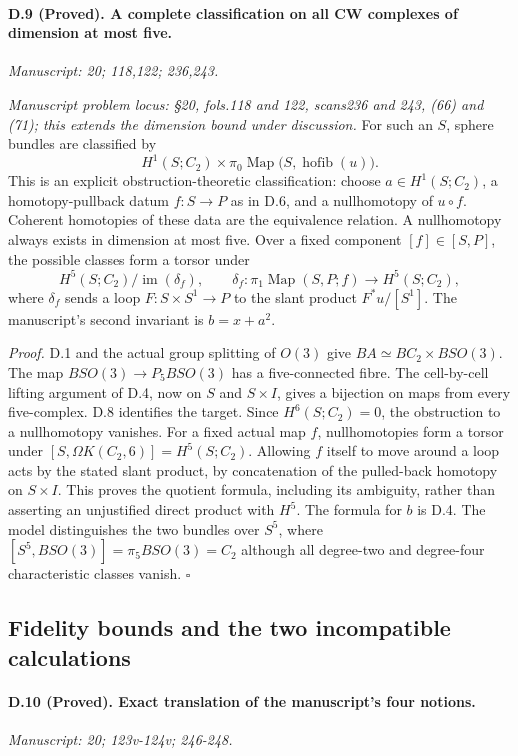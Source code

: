 \paragraph{D.9 (Proved). A complete classification on all CW complexes of dimension at most five.}
\textit{Manuscript: 20; 118,122; 236,243.}

\emph{Manuscript problem locus: \S20, fols.118 and 122, scans236 and 243, (66) and (71); this extends the dimension bound under discussion.}
For such an $S$, sphere bundles are classified by
\[
H^1(S;C_2)\times
\pi_0\operatorname{Map}\bigl(S,\operatorname{hofib}(u)\bigr).
\]
This is an explicit obstruction-theoretic classification: choose $a\in H^1(S;C_2)$, a homotopy-pullback datum $f:S\to P$ as in D.6, and a nullhomotopy of $u\circ f$. Coherent homotopies of these data are the equivalence relation. A nullhomotopy always exists in dimension at most five. Over a fixed component $[f]\in[S,P]$, the possible classes form a torsor under
\[
H^5(S;C_2)\big/\operatorname{im}(\delta_f),\qquad
\delta_f:\pi_1\operatorname{Map}(S,P;f)\longrightarrow H^5(S;C_2),
\]
where $\delta_f$ sends a loop $F:S\times S^1\to P$ to the slant product $F^*u/[S^1]$. The manuscript's second invariant is $b=x+a^2$.

\emph{Proof.} D.1 and the actual group splitting of $O(3)$ give $BA\simeq BC_2\times BSO(3)$. The map $BSO(3)\to P_5BSO(3)$ has a five-connected fibre. The cell-by-cell lifting argument of D.4, now on $S$ and $S\times I$, gives a bijection on maps from every five-complex. D.8 identifies the target. Since $H^6(S;C_2)=0$, the obstruction to a nullhomotopy vanishes. For a fixed actual map $f$, nullhomotopies form a torsor under $[S,\Omega K(C_2,6)]=H^5(S;C_2)$. Allowing $f$ itself to move around a loop acts by the stated slant product, by concatenation of the pulled-back homotopy on $S\times I$. This proves the quotient formula, including its ambiguity, rather than asserting an unjustified direct product with $H^5$. The formula for $b$ is D.4. The model distinguishes the two bundles over $S^5$, where $[S^5,BSO(3)]=\pi_5BSO(3)=C_2$ although all degree-two and degree-four characteristic classes vanish. \hfill$\square$

\subsection{Fidelity bounds and the two incompatible calculations}

\paragraph{D.10 (Proved). Exact translation of the manuscript's four notions.}
\textit{Manuscript: 20; 123v-124v; 246-248.}

